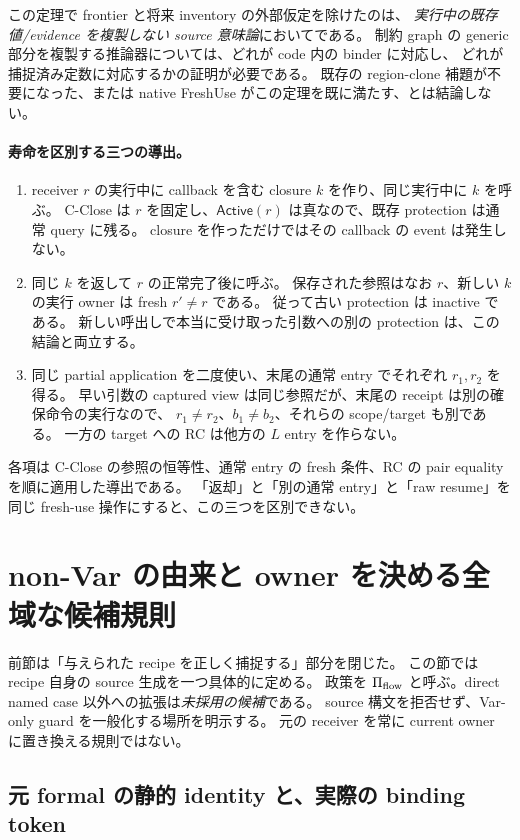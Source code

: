 \documentclass[11pt,a4paper]{article}
\newcommand{\Act}{\mathsf{Active}}
\begin{document}
この定理で frontier と将来 inventory の外部仮定を除けたのは、
\emph{実行中の既存値/evidence を複製しない source 意味論}においてである。
制約 graph の generic 部分を複製する推論器については、どれが code 内の binder に対応し、
どれが捕捉済み定数に対応するかの証明が必要である。
既存の region-clone 補題が不要になった、または native FreshUse がこの定理を既に満たす、とは結論しない。

\paragraph{寿命を区別する三つの導出。}
\begin{enumerate}
\item receiver \(r\) の実行中に callback を含む closure \(k\) を作り、同じ実行中に \(k\) を呼ぶ。
C-Close は \(r\) を固定し、\(\Act(r)\) は真なので、既存 protection は通常 query に残る。
closure を作っただけではその callback の event は発生しない。
\item 同じ \(k\) を返して \(r\) の正常完了後に呼ぶ。
保存された参照はなお \(r\)、新しい \(k\) の実行 owner は fresh \(r'\ne r\) である。
従って古い protection は inactive である。
新しい呼出しで本当に受け取った引数への別の protection は、この結論と両立する。
\item 同じ partial application を二度使い、末尾の通常 entry でそれぞれ \(r_1,r_2\) を得る。
早い引数の captured view は同じ参照だが、末尾の receipt は別の確保命令の実行なので、
\(r_1\ne r_2\)、\(b_1\ne b_2\)、それらの scope/target も別である。
一方の target への RC は他方の \(L\) entry を作らない。
\end{enumerate}
各項は C-Close の参照の恒等性、通常 entry の fresh 条件、RC の pair equality を順に適用した導出である。
「返却」と「別の通常 entry」と「raw resume」を同じ fresh-use 操作にすると、この三つを区別できない。

\section{non-Var の由来と owner を決める全域な候補規則}
\label{sec:flow-policy}

前節は「与えられた recipe を正しく捕捉する」部分を閉じた。
この節では recipe 自身の source 生成を一つ具体的に定める。
政策を \(\Pi_{\rm flow}\) と呼ぶ。direct named case 以外への拡張は\emph{未採用の候補}である。
source 構文を拒否せず、Var-only guard を一般化する場所を明示する。
元の receiver を常に current owner に置き換える規則ではない。

\subsection{元 formal の静的 identity と、実際の binding token}
\end{document}
